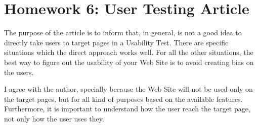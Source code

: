 \chapter{Homework 6: User Testing Article}
	The purpose of the article is to inform that, in general, is not a good idea to directly take users to target pages in a Usability Test. There are specific situations which the direct approach works well. For all the other situations, the best way to figure out the usability of your Web Site is to avoid creating bias on the users.

	I agree with the author, specially because the Web Site will not be used only on the target pages, but for all kind of purposes based on the available features. Furthermore, it is important to understand how the user reach the target page, not only how the user uses they.
